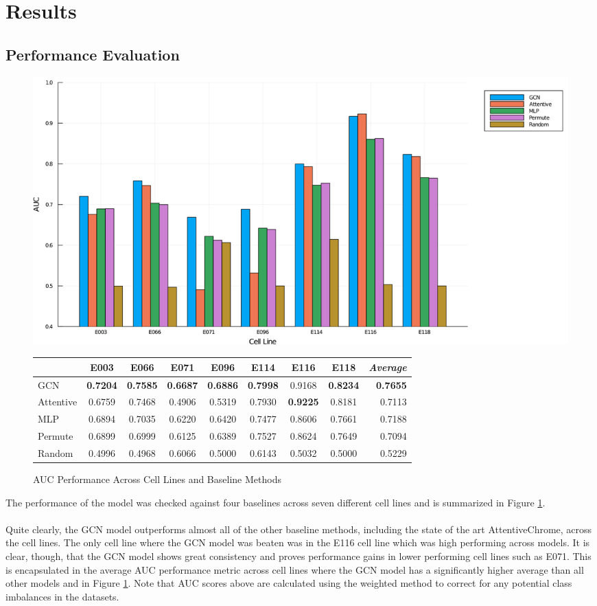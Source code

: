 \section{Results}
\subsection{Performance Evaluation}
\begin{figure}[h]
    \centering
    \includegraphics[width=\textwidth]{images/performance_bar.png}
    \begin{tabular}{l || c | c | c | c | c | c | c || r}
        & E003 & E066 & E071 & E096 & E114 & E116 & E118 & \emph{Average}\\ \hline 
        GCN & \textbf{0.7204} & \textbf{0.7585} & \textbf{0.6687} & \textbf{0.6886} & \textbf{0.7998} & 0.9168 & \textbf{0.8234} & \textbf{0.7655} \\
        Attentive & 0.6759 & 0.7468 & 0.4906 & 0.5319 & 0.7930 & \textbf{0.9225} & 0.8181 & 0.7113 \\
        MLP & 0.6894 & 0.7035 & 0.6220 & 0.6420 & 0.7477 & 0.8606 & 0.7661 & 0.7188 \\
        Permute & 0.6899 & 0.6999 & 0.6125 & 0.6389 & 0.7527 & 0.8624 & 0.7649 & 0.7094 \\
        Random & 0.4996 & 0.4968 & 0.6066 & 0.5000 & 0.6143 & 0.5032 & 0.5000 & 0.5229
    \end{tabular}
    \caption{AUC Performance Across Cell Lines and Baseline Methods}
    \label{figure:Figure1}
\end{figure}
The performance of the model was checked against four baselines across seven different cell lines and is summarized in Figure \ref{figure:Figure1}. \\\\
Quite clearly, the GCN model outperforms almost all of the other baseline methods, including the state of the art AttentiveChrome, across the cell lines. The only cell line where the GCN model was beaten was in the E116 cell line which was high performing across models. It is clear, though, that the GCN model shows great consistency and proves performance gains in lower performing cell lines such as E071. This is encapsulated in the average AUC performance metric across cell lines where the GCN model has a significantly higher average than all other models and in Figure \ref{figure:Figure1}. Note that AUC scores above are calculated using the weighted method to correct for any potential class imbalances in the datasets.
 